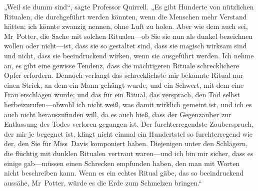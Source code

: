 „Weil sie dumm sind“, sagte Professor Quirrell.
„Es gibt Hunderte von nützlichen Ritualen, die durchgeführt werden könnten, wenn die Menschen mehr Verstand hätten; ich könnte zwanzig nennen, ohne Luft zu holen. Aber wie dem auch sei, Mr~Potter, die Sache mit solchen Ritualen—ob Sie sie nun als dunkel bezeichnen wollen oder nicht—ist, dass sie so gestaltet sind, dass sie magisch wirksam sind und nicht, dass sie beeindruckend wirken, wenn sie ausgeführt werden. Ich nehme an, es gibt eine gewisse Tendenz, dass die mächtigeren Rituale schrecklichere Opfer erfordern. Dennoch verlangt das schrecklichste mir bekannte Ritual nur einen Strick, an dem ein Mann gehängt wurde, und ein Schwert, mit dem eine Frau erschlagen wurde; und das für ein Ritual, das versprach, den Tod selbst herbeizurufen—obwohl ich nicht weiß, was damit wirklich gemeint ist, und ich es auch nicht herauszufinden will, da es auch hieß, dass der Gegenzauber zur Entlassung des Todes verloren gegangen ist. Der furchterregendste Zauberspruch, der mir je begegnet ist, klingt nicht einmal ein Hundertstel so furchterregend wie der, den Sie für Miss~Davis komponiert haben. Diejenigen unter den Schlägern, die flüchtig mit dunklen Ritualen vertraut waren—und ich bin mir sicher, dass es einige gab—müssen einen Schrecken empfunden haben, den man mit Worten nicht beschreiben kann. Wenn es ein echtes Ritual gäbe, das so beeindruckend aussähe, Mr~Potter, würde es die Erde zum Schmelzen bringen.“

